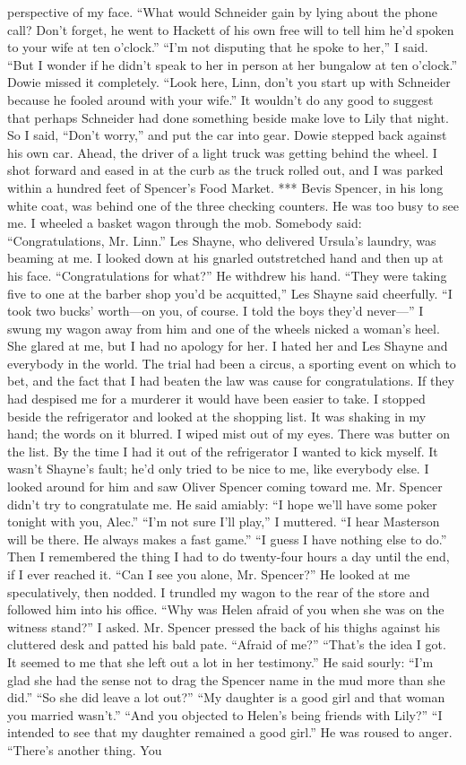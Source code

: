 \documentclass{novel}
\begin{document}
perspective of my face. “What would Schneider gain by lying about the phone call? Don’t forget, he went to Hackett of his own free will to tell him he’d spoken to your wife at ten o’clock.” “I’m not disputing that he spoke to her,” I said. “But I wonder if he didn’t speak to her in person at her bungalow at ten o’clock.” Dowie missed it completely. “Look here, Linn, don’t you start up with Schneider because he fooled around with your wife.” It wouldn’t do any good to suggest that perhaps Schneider had done something beside make love to Lily that night. So I said, “Don’t worry,” and put the car into gear. Dowie stepped back against his own car. Ahead, the driver of a light truck was getting behind the wheel. I shot forward and eased in at the curb as the truck rolled out, and I was parked within a hundred feet of Spencer’s Food Market. *** Bevis Spencer, in his long white coat, was behind one of the three checking counters. He was too busy to see me. I wheeled a basket wagon through the mob. Somebody said: “Congratulations, Mr. Linn.” Les Shayne, who delivered Ursula’s laundry, was beaming at me. I looked down at his gnarled outstretched hand and then up at his face. “Congratulations for what?” He withdrew his hand. “They were taking five to one at the barber shop you’d be acquitted,” Les Shayne said cheerfully. “I took two bucks’ worth—on you, of course. I told the boys they’d never—” I swung my wagon away from him and one of the wheels nicked a woman’s heel. She glared at me, but I had no apology for her. I hated her and Les Shayne and everybody in the world. The trial had been a circus, a sporting event on which to bet, and the fact that I had beaten the law was cause for congratulations. If they had despised me for a murderer it would have been easier to take. I stopped beside the refrigerator and looked at the shopping list. It was shaking in my hand; the words on it blurred. I wiped mist out of my eyes. There was butter on the list. By the time I had it out of the refrigerator I wanted to kick myself. It wasn’t Shayne’s fault; he’d only tried to be nice to me, like everybody else. I looked around for him and saw Oliver Spencer coming toward me. Mr. Spencer didn’t try to congratulate me. He said amiably: “I hope we’ll have some poker tonight with you, Alec.” “I’m not sure I’ll play,” I muttered. “I hear Masterson will be there. He always makes a fast game.” “I guess I have nothing else to do.” Then I remembered the thing I had to do twenty-four hours a day until the end, if I ever reached it. “Can I see you alone, Mr. Spencer?” He looked at me speculatively, then nodded. I trundled my wagon to the rear of the store and followed him into his office. “Why was Helen afraid of you when she was on the witness stand?” I asked. Mr. Spencer pressed the back of his thighs against his cluttered desk and patted his bald pate. “Afraid of me?” “That’s the idea I got. It seemed to me that she left out a lot in her testimony.” He said sourly: “I’m glad she had the sense not to drag the Spencer name in the mud more than she did.” “So she did leave a lot out?” “My daughter is a good girl and that woman you married wasn’t.” “And you objected to Helen’s being friends with Lily?” “I intended to see that my daughter remained a good girl.” He was roused to anger. “There’s another thing. You 
\end{document}

